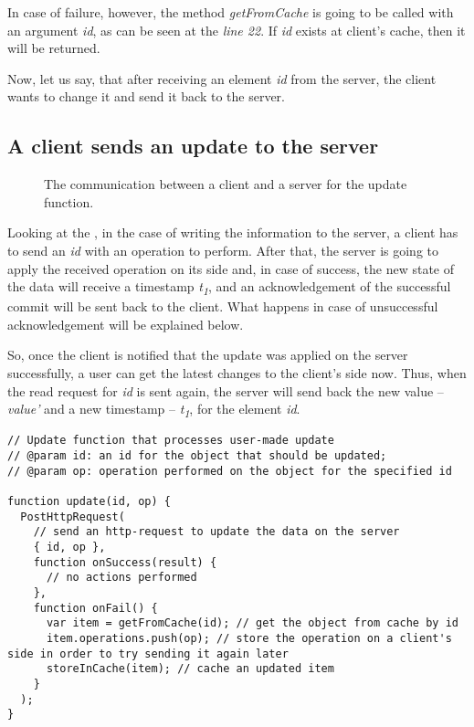In case of failure, however, the method \textit{getFromCache} is going to be called with an argument \textit{id}, as can be seen at the \textit{line 22}. If \textit{id} exists at client's cache, then it will be returned. 


Now, let us say, that after receiving an element \textit{id} from the server, the client wants to change it and send it back to the server.

\subsection*{A client sends an update to the server}

\begin{figure}[!htb]
    \begin{center}
    \def\svgwidth{\linewidth}
    
    \caption {The communication between a client and a server for the update function.}
    \label{fig:design3}
\end{center}
\end{figure}

Looking at the , in the case of writing the information to the server, a client has to send an \textit{id} with an operation to perform. After that, the server is going to apply the received operation on its side and, in case of success, the new state of the data will receive a timestamp \textit{t\textsubscript{1}}, and an acknowledgement of the successful commit will be sent back to the client. What happens in case of unsuccessful acknowledgement will be explained below. 

So, once the client is notified that the update was applied on the server successfully, a user can get the latest changes to the client's side now. Thus, when the read request for \textit{id} is sent again, the server will send back the new value -- \textit{value'} and a new timestamp -- \textit{t\textsubscript{1}}, for the element \textit{id}.

\begin{lstlisting}[caption={Pseudocode for making a request to change the data: client.}, label={lst:update1}]
// Update function that processes user-made update
// @param id: an id for the object that should be updated;
// @param op: operation performed on the object for the specified id

function update(id, op) {
  PostHttpRequest(
    // send an http-request to update the data on the server
    { id, op },
    function onSuccess(result) {
      // no actions performed
    },
    function onFail() {
      var item = getFromCache(id); // get the object from cache by id
      item.operations.push(op); // store the operation on a client's side in order to try sending it again later
      storeInCache(item); // cache an updated item
    }
  );
}
\end{lstlisting} 

